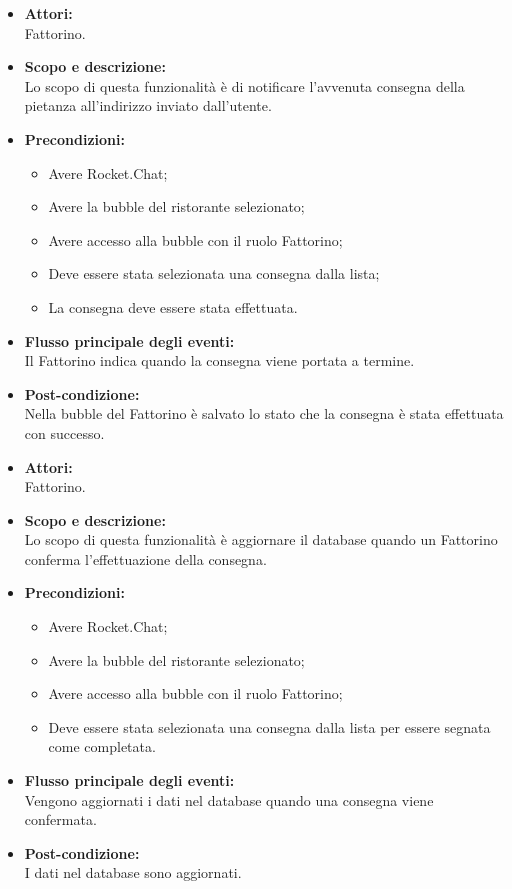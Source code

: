 
\begin{itemize}
	\item \textbf{Attori:}
	\\Fattorino.
	\item \textbf{Scopo e descrizione:} 
	\\Lo scopo di questa funzionalità è di notificare l'avvenuta consegna della pietanza all'indirizzo inviato dall'utente.
	\item \textbf{Precondizioni:}
	\begin{itemize}
		\item Avere Rocket.Chat;
		\item Avere la bubble del ristorante selezionato;
		\item Avere accesso alla bubble con il ruolo Fattorino;
		\item Deve essere stata selezionata una consegna dalla lista;
		\item La consegna deve essere stata effettuata.
	\end{itemize}
	\item \textbf{Flusso principale degli eventi:}
	\\Il Fattorino indica quando la consegna viene portata a termine.
	\item \textbf{Post-condizione:}
	\\Nella bubble del Fattorino è salvato lo stato che la consegna è stata effettuata con successo.
\end{itemize}


\begin{itemize}
	\item \textbf{Attori:}
	\\Fattorino.
	\item \textbf{Scopo e descrizione:} 
	\\Lo scopo di questa funzionalità è aggiornare il database quando un Fattorino conferma l'effettuazione della consegna.
	\item \textbf{Precondizioni:}
	\begin{itemize}
		\item Avere Rocket.Chat;
		\item Avere la bubble del ristorante selezionato;
		\item Avere accesso alla bubble con il ruolo Fattorino;
		\item Deve essere stata selezionata una consegna dalla lista per essere segnata come completata.
	\end{itemize}
	\item \textbf{Flusso principale degli eventi:}
	\\Vengono aggiornati i dati nel database quando una consegna viene confermata.
	\item \textbf{Post-condizione:}
	\\I dati nel database sono aggiornati.
\end{itemize}

